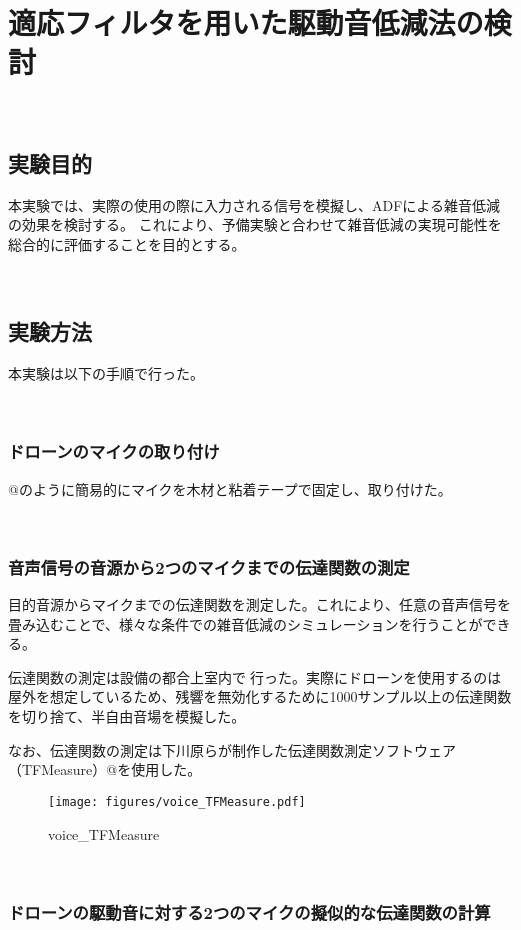 \
\chapter{適応フィルタを用いた駆動音低減法の検討}\label{adf-practice}

\
\section{実験目的}\label{purpose-practice}

本実験では、実際の使用の際に入力される信号を模擬し、ADFによる雑音低減の効果を検討する。
これにより、予備実験と合わせて雑音低減の実現可能性を総合的に評価することを目的とする。

\
\section{実験方法}\label{instruction-practice}

本実験は以下の手順で行った。

\
\subsection{ドローンのマイクの取り付け}\label{installment-mic}

@のように簡易的にマイクを木材と粘着テープで固定し、取り付けた。

\
\subsection{音声信号の音源から2つのマイクまでの伝達関数の測定}\label{observation-tf}

目的音源からマイクまでの伝達関数を測定した。これにより、任意の音声信号を畳み込むことで、様々な条件での雑音低減のシミュレーションを行うことができる。

伝達関数の測定は設備の都合上室内で行った。実際にドローンを使用するのは屋外を想定しているため、残響を無効化するために1000サンプル以上の伝達関数を切り捨て、半自由音場を模擬した。

なお、伝達関数の測定は下川原らが制作した伝達関数測定ソフトウェア（TFMeasure）@を使用した。

\begin{figure}
\centering
\texttt{[image: figures/voice\_TFMeasure.pdf]}
\caption{voice\_TFMeasure}
\end{figure}

\
\subsection{ドローンの駆動音に対する2つのマイクの擬似的な伝達関数の計算}\label{pseudo-tf}

